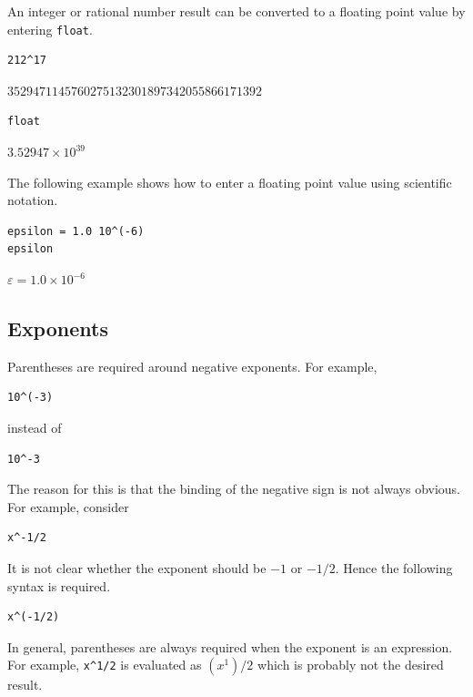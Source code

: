 \documentclass[12pt]{article}
\begin{document}
An integer or rational number result can be converted to a floating
point value by entering \verb$float$.

{\color{blue}
\begin{verbatim}
212^17
\end{verbatim}
}

$\displaystyle 3529471145760275132301897342055866171392$

{\color{blue}
\begin{verbatim}
float
\end{verbatim}
}

$\displaystyle 3.52947\times10^{39}$

\bigskip

The following example shows how to enter a floating point value
using scientific notation.

{\color{blue}
\begin{verbatim}
epsilon = 1.0 10^(-6)
epsilon
\end{verbatim}
}

$\displaystyle \varepsilon=1.0\times10^{-6}$

\subsection{Exponents}

Parentheses are required around negative exponents.
For example,

{\color{blue}
\begin{verbatim}
10^(-3)
\end{verbatim}
}

instead of

{\color{blue}
\begin{verbatim}
10^-3
\end{verbatim}
}

The reason for this is that the binding of the negative sign is not always obvious.
For example, consider

{\color{blue}
\begin{verbatim}
x^-1/2
\end{verbatim}
}

It is not clear whether the exponent should be $-1$ or $-1/2$.
Hence the following syntax is required.

{\color{blue}
\begin{verbatim}
x^(-1/2)
\end{verbatim}
}

In general, parentheses are always required when the exponent
is an expression.
For example, \verb$x^1/2$ is evaluated as $(x^1)/2$ which
is probably not the desired result.
\end{document}
